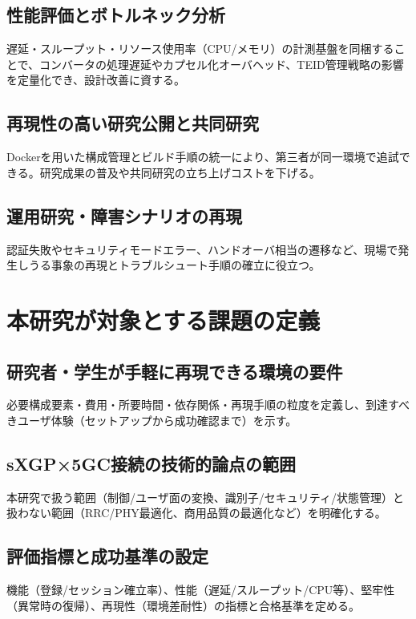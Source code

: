\subsection{性能評価とボトルネック分析}
遅延・スループット・リソース使用率（CPU/メモリ）の計測基盤を同梱することで、コンバータの処理遅延やカプセル化オーバヘッド、TEID管理戦略の影響を定量化でき、設計改善に資する。

\subsection{再現性の高い研究公開と共同研究}
Dockerを用いた構成管理とビルド手順の統一により、第三者が同一環境で追試できる。研究成果の普及や共同研究の立ち上げコストを下げる。

\subsection{運用研究・障害シナリオの再現}
認証失敗やセキュリティモードエラー、ハンドオーバ相当の遷移など、現場で発生しうる事象の再現とトラブルシュート手順の確立に役立つ。

\section{本研究が対象とする課題の定義}
\subsection{研究者・学生が手軽に再現できる環境の要件}
必要構成要素・費用・所要時間・依存関係・再現手順の粒度を定義し、到達すべきユーザ体験（セットアップから成功確認まで）を示す。
\subsection{sXGP×5GC接続の技術的論点の範囲}
本研究で扱う範囲（制御/ユーザ面の変換、識別子/セキュリティ/状態管理）と扱わない範囲（RRC/PHY最適化、商用品質の最適化など）を明確化する。
\subsection{評価指標と成功基準の設定}
機能（登録/セッション確立率）、性能（遅延/スループット/CPU等）、堅牢性（異常時の復帰）、再現性（環境差耐性）の指標と合格基準を定める。







